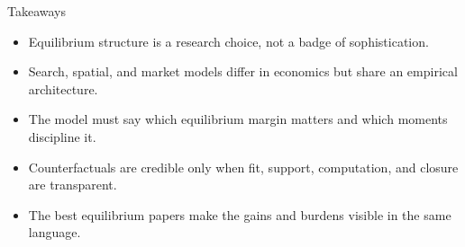 \documentclass[aspectratio=169,11pt]{beamer}
\newcommand{\1}{\mathbf{1}}
\begin{document}
\begin{frame}{Takeaways}
\begin{itemize}
    \item Equilibrium structure is a research choice, not a badge of sophistication.
    \item Search, spatial, and market models differ in economics but share an empirical architecture.
    \item The model must say which equilibrium margin matters and which moments discipline it.
    \item Counterfactuals are credible only when fit, support, computation, and closure are transparent.
    \item The best equilibrium papers make the gains and burdens visible in the same language.
\end{itemize}
\end{frame}
\end{document}
